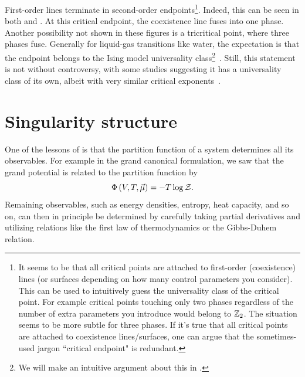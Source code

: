 First-order lines terminate in second-order 
endpoints\footnote{It seems to be that
all critical points are attached to first-order (coexistence) lines
(or surfaces depending on how many control parameters you consider).
This can be used to intuitively guess the universality class of
the critical point. For example critical points touching only two phases
regardless of the number of extra parameters you introduce would
belong to $\mathbb{Z}_2$. The situation seems to be more subtle for three phases.
If it's true that all critical points are attached to coexistence
lines/surfaces, one can argue that the sometimes-used jargon
``critical endpoint" is redundant.}.
Indeed, this
can be seen in both  and .
At this critical endpoint, the coexistence line fuses into one phase.
Another possibility not shown in these figures is a tricritical point, 
where three phases fuse. Generally for liquid-gas transitions like
water, the expectation is that the endpoint belongs to the Ising
model universality
class\footnote{We will make an intuitive argument about this
in .}~\cite{hubbard_wilson_1972,bruce_scaling_1992,wilding_critical-point_1995,yarmolinsky_revisiting_2017}.
Still, this statement is not without controversy, with some studies suggesting
it has a universality class of its own, albeit with very similar
critical exponents~\cite{valls_liquid-gas_1978}.


\section{Singularity structure}\label{sec:leeyang}

One of the lessons of  is that the partition function of a
system determines all its observables. For example in the grand canonical
formulation, we saw that the grand potential is related to the partition
function by
\begin{equation}\label{eq:grandPotZ}
  \Phi\left(V,T,\vec{\mu}\right)=-T\log\mathcal{Z}.
\end{equation}
Remaining observables, such as energy densities, entropy, heat capacity, and so
on, can then in principle be determined by carefully taking partial derivatives
and utilizing relations like the first law of thermodynamics or the Gibbs-Duhem
relation.


